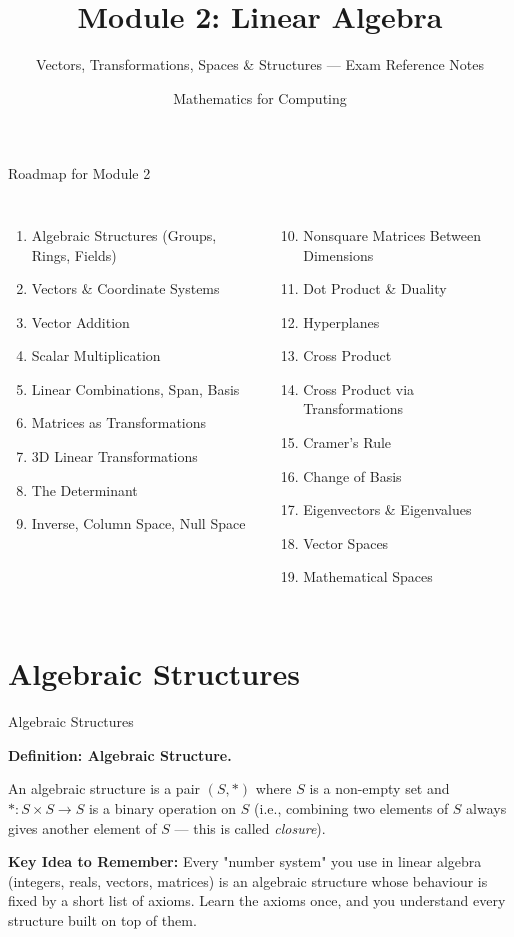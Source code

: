 \documentclass[9pt,aspectratio=169]{beamer}
\title{Module 2: Linear Algebra}
\subtitle{Vectors, Transformations, Spaces \& Structures --- Exam Reference Notes}
\author{Mathematics for Computing}
\newcommand{\keyidea}[1]{%
\par\medskip\noindent\textbf{Key Idea to Remember:} #1\par\medskip}
\begin{document}
\begin{frame}
\titlepage
\end{frame}

\begin{frame}{Roadmap for Module 2}
\small
\begin{columns}[t]
\begin{enumerate}
\item Algebraic Structures (Groups, Rings, Fields)
\item Vectors \& Coordinate Systems
\item Vector Addition
\item Scalar Multiplication
\item Linear Combinations, Span, Basis
\item Matrices as Transformations
\item 3D Linear Transformations
\item The Determinant
\item Inverse, Column Space, Null Space
\end{enumerate}
\begin{enumerate}
\setcounter{enumi}{9}
\item Nonsquare Matrices Between Dimensions
\item Dot Product \& Duality
\item Hyperplanes
\item Cross Product
\item Cross Product via Transformations
\item Cramer's Rule
\item Change of Basis
\item Eigenvectors \& Eigenvalues
\item Vector Spaces
\item Mathematical Spaces
\end{enumerate}
\end{columns}
\end{frame}

\section{Algebraic Structures}

\begin{frame}{Algebraic Structures}


\par\noindent\textbf{Definition: Algebraic Structure.}\par
An algebraic structure is a pair $(S, *)$ where $S$ is a non-empty set and
$* : S \times S \to S$ is a binary operation on $S$ (i.e., combining two elements of $S$
always gives another element of $S$ --- this is called \emph{closure}).
\medskip

\keyidea{Every "number system" you use in linear algebra (integers, reals, vectors,
matrices) is an algebraic structure whose behaviour is fixed by a short list of axioms.
Learn the axioms once, and you understand every structure built on top of them.}
\end{frame}
\end{document}

